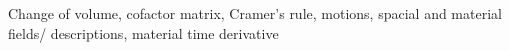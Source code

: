 Change of volume, cofactor matrix, Cramer's rule, motions, spacial and material fields/ descriptions, material time derivative